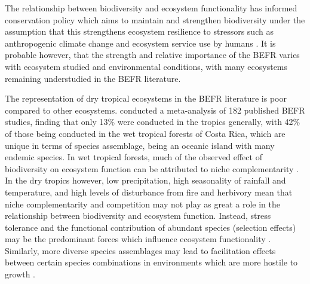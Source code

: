 \documentclass[11pt,a4paper]{article}
\begin{document}
The relationship between biodiversity and ecosystem functionality has informed conservation policy which aims to maintain and strengthen biodiversity under the assumption that this strengthens ecosystem resilience to stressors such as anthropogenic climate change and ecosystem service use by humans \citep{Thompson2011}. It is probable however, that the strength and relative importance of the BEFR varies with ecosystem studied and environmental conditions, with many ecosystems remaining understudied in the BEFR literature.

The representation of dry tropical ecosystems in the BEFR literature is poor compared to other ecosystems. \citet{Clarke2017} conducted a meta-analysis of 182 published BEFR studies, finding that only 13\% were conducted in the tropics generally, with 42\% of those being conducted in the wet tropical forests of Costa Rica, which are unique in terms of species assemblage, being an oceanic island with many endemic species. In wet tropical forests, much of the observed effect of biodiversity on ecosystem function can be attributed to niche complementarity \citep{Wright2017, MORE}. In the dry tropics however, low precipitation, high seasonality of rainfall and temperature, and high levels of disturbance from fire and herbivory mean that niche complementarity and competition may not play as great a role in the relationship between biodiversity and ecosystem function. Instead, stress tolerance and the functional contribution of abundant species (selection effects) may be the predominant forces which influence ecosystem functionality \citep{}. Similarly, more diverse species assemblages may lead to facilitation effects between certain species combinations in environments which are more hostile to growth \citep{Ratcliffe2017}.
\end{document}
